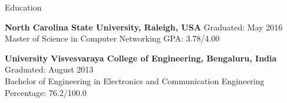 \documentclass{resume} %
\begin{document}
    \begin{rSection}{Education}
    
        \begin{rSubsectionEducation}
            {\bf North Carolina State University, Raleigh, USA} \hfill {Graduated: May 2016} \\ 
            Master of Science in Computer Networking \hfill {GPA: 3.78/4.00}
            \begin{comment} %
                \\Course Work: Internet Protocols, Introduction to Operating Systems, Introduction to Algorithms,\\
                \hphantom{Course Work: }Network Design and Management, Routed Network Design and Management,\\
                \hphantom{Course Work: }High Performance Cloud Service, Computer and Network Security
            \end{comment}
        \end{rSubsectionEducation}
        
        \begin{rSubsectionEducation}
            {\bf University Visvesvaraya College of Engineering, Bengaluru, India} \hfill { Graduated: August 2013} \\ 
            Bachelor of Engineering in Electronics and Communication Engineering \hfill {Percentage: 76.2/100.0}
            \begin{comment} %
                \\Course Work: Digital Electronics, Computer Architecture and Organization, Microprocessors,\\
                \hphantom{Course Work: }Microcontrollers, Embedded Systems, Computer Networks, Probability and Stochastic Process
            \end{comment}
        \end{rSubsectionEducation}
    
    \end{rSection}
\end{document}
